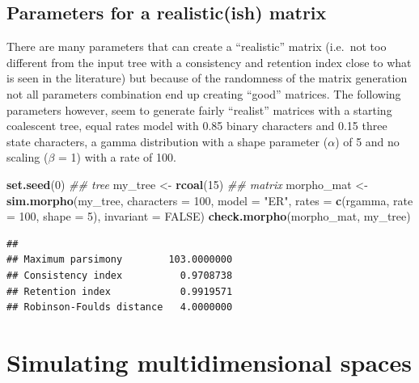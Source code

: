 \documentclass[
]{book}
\newenvironment{Shaded}{\begin{snugshade}}{\end{snugshade}}
\newcommand{\CommentTok}[1]{\textcolor[rgb]{0.56,0.35,0.01}{\textit{#1}}}
\newcommand{\DataTypeTok}[1]{\textcolor[rgb]{0.13,0.29,0.53}{#1}}
\newcommand{\DecValTok}[1]{\textcolor[rgb]{0.00,0.00,0.81}{#1}}
\newcommand{\KeywordTok}[1]{\textcolor[rgb]{0.13,0.29,0.53}{\textbf{#1}}}
\newcommand{\NormalTok}[1]{#1}
\newcommand{\OtherTok}[1]{\textcolor[rgb]{0.56,0.35,0.01}{#1}}
\newcommand{\StringTok}[1]{\textcolor[rgb]{0.31,0.60,0.02}{#1}}
\begin{document}
\hypertarget{parameters-for-a-realisticish-matrix}{%
\subsection{Parameters for a realistic(ish) matrix}\label{parameters-for-a-realisticish-matrix}}

There are many parameters that can create a ``realistic'' matrix (i.e.~not too different from the input tree with a consistency and retention index close to what is seen in the literature) but because of the randomness of the matrix generation not all parameters combination end up creating ``good'' matrices.
The following parameters however, seem to generate fairly ``realist'' matrices with a starting coalescent tree, equal rates model with 0.85 binary characters and 0.15 three state characters, a gamma distribution with a shape parameter (\(\alpha\)) of 5 and no scaling (\(\beta\) = 1) with a rate of 100.

\begin{Shaded}
\begin{Highlighting}[]
\KeywordTok{set.seed}\NormalTok{(}\DecValTok{0}\NormalTok{)}
\CommentTok{\#\# tree}
\NormalTok{my\_tree \textless{}{-}}\StringTok{ }\KeywordTok{rcoal}\NormalTok{(}\DecValTok{15}\NormalTok{)}
\CommentTok{\#\# matrix}
\NormalTok{morpho\_mat \textless{}{-}}\StringTok{ }\KeywordTok{sim.morpho}\NormalTok{(my\_tree,}
                         \DataTypeTok{characters =} \DecValTok{100}\NormalTok{,}
                         \DataTypeTok{model =} \StringTok{"ER"}\NormalTok{,}
                         \DataTypeTok{rates =} \KeywordTok{c}\NormalTok{(rgamma, }\DataTypeTok{rate =} \DecValTok{100}\NormalTok{, }\DataTypeTok{shape =} \DecValTok{5}\NormalTok{),}
                         \DataTypeTok{invariant =} \OtherTok{FALSE}\NormalTok{)}
\KeywordTok{check.morpho}\NormalTok{(morpho\_mat, my\_tree)}
\end{Highlighting}
\end{Shaded}

\begin{verbatim}
##                                     
## Maximum parsimony        103.0000000
## Consistency index          0.9708738
## Retention index            0.9919571
## Robinson-Foulds distance   4.0000000
\end{verbatim}

\hypertarget{simulating-multidimensional-spaces}{%
\section{Simulating multidimensional spaces}\label{simulating-multidimensional-spaces}}
\end{document}
